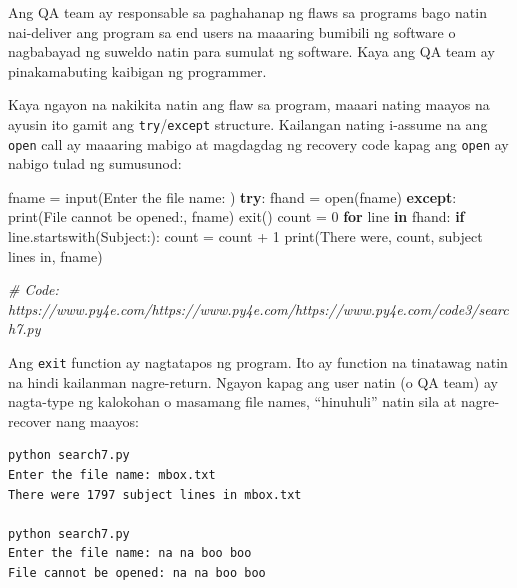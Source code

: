 \documentclass[10pt,]{book}
\newenvironment{Shaded}{}{}
\newcommand{\BuiltInTok}[1]{\textcolor[rgb]{0.00,0.50,0.00}{#1}}
\newcommand{\CommentTok}[1]{\textcolor[rgb]{0.38,0.63,0.69}{\textit{#1}}}
\newcommand{\ControlFlowTok}[1]{\textcolor[rgb]{0.00,0.44,0.13}{\textbf{#1}}}
\newcommand{\DecValTok}[1]{\textcolor[rgb]{0.25,0.63,0.44}{#1}}
\newcommand{\KeywordTok}[1]{\textcolor[rgb]{0.00,0.44,0.13}{\textbf{#1}}}
\newcommand{\NormalTok}[1]{#1}
\newcommand{\OperatorTok}[1]{\textcolor[rgb]{0.40,0.40,0.40}{#1}}
\newcommand{\StringTok}[1]{\textcolor[rgb]{0.25,0.44,0.63}{#1}}
\begin{document}
 

Ang QA team ay responsable sa paghahanap ng flaws sa programs bago natin
nai-deliver ang program sa end users na maaaring bumibili ng software o
nagbabayad ng suweldo natin para sumulat ng software. Kaya ang QA team
ay pinakamabuting kaibigan ng programmer.

  
  

Kaya ngayon na nakikita natin ang flaw sa program, maaari nating maayos
na ayusin ito gamit ang \texttt{try}/\texttt{except} structure.
Kailangan nating i-assume na ang \texttt{open} call ay maaaring mabigo
at magdagdag ng recovery code kapag ang \texttt{open} ay nabigo tulad ng
sumusunod:

\begin{Shaded}
\begin{Highlighting}[]
\NormalTok{fname }\OperatorTok{=} \BuiltInTok{input}\NormalTok{(}\StringTok{\textquotesingle{}Enter the file name: \textquotesingle{}}\NormalTok{)}
\ControlFlowTok{try}\NormalTok{:}
\NormalTok{    fhand }\OperatorTok{=} \BuiltInTok{open}\NormalTok{(fname)}
\ControlFlowTok{except}\NormalTok{:}
    \BuiltInTok{print}\NormalTok{(}\StringTok{\textquotesingle{}File cannot be opened:\textquotesingle{}}\NormalTok{, fname)}
\NormalTok{    exit()}
\NormalTok{count }\OperatorTok{=} \DecValTok{0}
\ControlFlowTok{for}\NormalTok{ line }\KeywordTok{in}\NormalTok{ fhand:}
    \ControlFlowTok{if}\NormalTok{ line.startswith(}\StringTok{\textquotesingle{}Subject:\textquotesingle{}}\NormalTok{):}
\NormalTok{        count }\OperatorTok{=}\NormalTok{ count }\OperatorTok{+} \DecValTok{1}
\BuiltInTok{print}\NormalTok{(}\StringTok{\textquotesingle{}There were\textquotesingle{}}\NormalTok{, count, }\StringTok{\textquotesingle{}subject lines in\textquotesingle{}}\NormalTok{, fname)}

\CommentTok{\# Code: https://www.py4e.com/https://www.py4e.com/https://www.py4e.com/code3/search7.py}
\end{Highlighting}
\end{Shaded}


Ang \texttt{exit} function ay nagtatapos ng program. Ito ay function na
tinatawag natin na hindi kailanman nagre-return. Ngayon kapag ang user
natin (o QA team) ay nagta-type ng kalokohan o masamang file names,
``hinuhuli'' natin sila at nagre-recover nang maayos:

{\small
\begin{verbatim}
python search7.py
Enter the file name: mbox.txt
There were 1797 subject lines in mbox.txt

python search7.py
Enter the file name: na na boo boo
File cannot be opened: na na boo boo
\end{verbatim}
}
\end{document}
